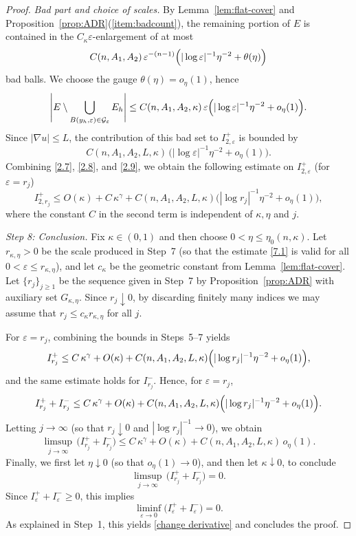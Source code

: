 \documentclass[reqno,11pt]{amsart}
\numberwithin{equation}{section}
\theoremstyle{remark}
\begin{document}
\begin{proof}
\smallskip
\noindent\emph{Bad part and choice of scales.}
{By Lemma~\ref{lem:flat-cover} and Proposition~\ref{prop:ADR}(\ref{item:badcount}), the remaining portion of $E$ is contained in
the $C_\kappa\varepsilon$-enlargement of at most}
\[
{
C(n,A_1,A_2)\,\varepsilon^{-(n-1)}\Bigl(|\log\varepsilon|^{-1}\eta^{-2}+\theta(\eta)\Bigr)
}
\]
{bad balls. We choose the gauge $\theta(\eta)=o_\eta(1)$, hence}
\begin{equation}\label{2.9}
{
\Bigg|E\setminus\bigcup_{B(y_h,\varepsilon)\in\mathcal G_\varepsilon}E_h\Bigg|
\le C(n,A_1,A_2,\kappa)\,\varepsilon
\Bigl(|\log\varepsilon|^{-1}\eta^{-2}+o_\eta(1)\Bigr).
}
\end{equation}
{Since $|\nabla u|\le L$, the contribution of this bad set to $I^+_{2,\varepsilon}$ is bounded by}
$$
{
C(n,A_1,A_2,L,\kappa)\,\bigl(|\log\varepsilon|^{-1}\eta^{-2}+o_\eta(1)\bigr).
}
$$
{Combining \eqref{2.7}, \eqref{2.8}, and \eqref{2.9}, we obtain the following estimate on $I^+_{2,\varepsilon}$
(for $\varepsilon=r_j$)}
$$
{I_{2, r_j}^+\le O(\kappa) +  C\,\kappa^\gamma
 + C(n,A_1,A_2,L,\kappa)\bigl(|\log r_j|^{-1}\eta^{-2}+o_\eta(1)\bigr),}
$$
{where the constant $C$ in the second term is independent of $\kappa,\eta$ and $j$.}


\medskip
\noindent\textit{Step 8: Conclusion.}
Fix $\kappa\in(0,1)$ and {then choose $0<\eta\le\eta_0(n,\kappa)$}. Let $r_{\kappa,\eta}>0$ be the scale produced in
Step~7 (so that the estimate \eqref{7.1} is valid for all
$0<\varepsilon\le r_{\kappa,\eta}$), {and let $c_\kappa$ be the geometric constant from Lemma~\ref{lem:flat-cover}}.
Let $\{r_j\}_{j\ge 1}$ be the sequence given in Step~7 by Proposition~\ref{prop:ADR} {with auxiliary set $G_{\kappa,\eta}$}.
Since $r_j\downarrow 0$, by discarding finitely many indices we may assume that
{$r_j\le c_\kappa r_{\kappa,\eta}$} for all $j$.

For $\varepsilon=r_j$, combining the bounds in Steps~5--7 yields
\[
I^+_{r_j}\le C\,\kappa^\gamma + O(\kappa)
+ {C(n,A_1,A_2,L,\kappa)}\Bigl(|\log r_j|^{-1}\eta^{-2}+o_\eta(1)\Bigr),
\]
and the same estimate holds for $I^-_{r_j}$. Hence, for $\varepsilon=r_j$,
\[
I^+_{r_j}+I^-_{r_j}\le C\,\kappa^\gamma + O(\kappa)
+ {C(n,A_1,A_2,L,\kappa)}\Bigl(|\log r_j|^{-1}\eta^{-2}+o_\eta(1)\Bigr).
\]
Letting $j\to\infty$ (so that $r_j\downarrow 0$ and $|\log r_j|^{-1}\to 0$), we obtain
\[
\limsup_{j\to\infty}\,\bigl(I^+_{r_j}+I^-_{r_j}\bigr)
\le C\,\kappa^\gamma + O(\kappa) + {C(n,A_1,A_2,L,\kappa)}\,o_\eta(1).
\]
Finally, we first let $\eta\downarrow 0$ (so that $o_\eta(1)\to 0$), and then let
$\kappa\downarrow 0$, to conclude
\[
\limsup_{j\to\infty}\, \bigl(I^+_{r_j}+I^-_{r_j}\bigr)=0.
\]
Since $I^+_\varepsilon+I^-_\varepsilon\ge 0$, this implies
\[
\liminf_{\varepsilon\to 0}\bigl(I^+_\varepsilon+I^-_\varepsilon\bigr)=0.
\]
As explained in Step~1, this yields \eqref{change derivative} and concludes the proof.
\end{proof}
\end{document}
